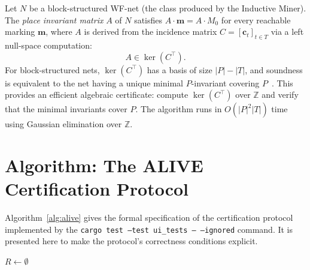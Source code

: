 Let $N$ be a block-structured WF-net (the class produced by the Inductive
Miner). The \emph{place invariant matrix} $A$ of $N$ satisfies
$A \cdot \mathbf{m} = A \cdot M_0$ for every reachable marking $\mathbf{m}$,
where $A$ is derived from the incidence matrix $C = [\mathbf{c}_t]_{t \in T}$
via a left null-space computation:
\[
  A \in \ker(C^\top).
\]
For block-structured nets, $\ker(C^\top)$ has a basis of size $|P| - |T|$,
and soundness is equivalent to the net having a unique minimal $P$-invariant
covering $P$~\cite{murata1989petri}. This provides an efficient algebraic
certificate: compute $\ker(C^\top)$ over $\mathbb{Z}$ and verify that the
minimal invariants cover $P$. The algorithm runs in $O(|P|^2 |T|)$ time
using Gaussian elimination over $\mathbb{Z}$.

\section{Algorithm: The ALIVE Certification Protocol}
\label{sec:conc-alive-algo}

Algorithm~\ref{alg:alive} gives the formal specification of the certification
protocol implemented by the \texttt{cargo test --test ui\_tests -- --ignored}
command. It is presented here to make the protocol's correctness conditions
explicit.

\begin{algorithm}[H]
\caption{ALIVE Certification Protocol}
\label{alg:alive}
\DontPrintSemicolon
{}
\BlankLine
$R \leftarrow \emptyset$\;
\BlankLine
{}
\BlankLine
{}
\BlankLine
{}
\BlankLine
{}
\end{algorithm}

